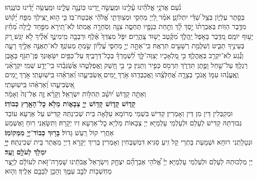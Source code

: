 \documentclass[twoside, openany, parskip=half, 11pt]{book}
\begin{document}
\begin{sometimes}


\halfkaddish


\label{vihi noam}

נֹ֨עַם אֲדֹנָ֥י אֱלֹהֵ֗ינוּ עָ֫לֵ֥ינוּ וּמַֽעֲשֵׂ֣ה יָ֭דֵינוּ כּֽוֹנֲנָ֣ה עָלֵ֑ינוּ וּמַֽעֲשֵׂ֥ה יָ֝דֵ֗ינוּ כּֽוֹנֲנֵֽהוּ׃\\
בְּסֵ֣תֶר עֶלְי֑וֹן בְּצֵ֥ל שַׁ֝דַּ֗י יִתְלוֹנָֽן׃
אֹמַ֗ר לַ֭יְיָ מַחְסִ֣י וּמְצֽוּדָתִ֑י אֱ֝לֹהַ֗י אֶבְטַח־בּֽוֹ׃
כִּ֤י ה֣וּא יַ֭צִּֽילְךָ מִפַּ֥ח יָ֝ק֗וּשׁ מִדֶּ֥בֶר הַוּֽוֹת׃
בְּאֶבְרָת֨וֹ יָ֣סֶךְ לָ֗ךְ וְתַ֣חַת כְּנָפָ֣יו תֶּחְסֶ֑ה צִנָּ֖ה וְסֹֽחֵרָ֣ה אֲמִתּֽוֹ׃
לֹֽא־תִ֭ירָא מִפַּ֣חַד לָ֑יְלָה מֵ֝חֵ֗ץ יָע֥וּף יוֹמָֽם׃
מִ֭דֶּֽבֶר בָּאֹ֣פֶל יַֽהֲלֹ֑ךְ מִ֝קֶּ֗טֶב יָשׁ֥וּד צָֽהֳרָֽיִם׃
יִפֹּ֤ל מִצִּדְּךָ֙ אֶ֗לֶף וּרְבָבָ֥ה מִֽימִינֶ֑ךָ אֵ֝לֶ֗יךָ לֹ֣א יִגָּֽשׁ׃
רַ֭ק בְּעֵינֶ֣יךָ תַבִּ֑יט וְשִׁלֻּמַ֖ת רְשָׁעִ֣ים תִּרְאֶֽה׃
כִּֽי־אַתָּ֣ה יְיָ֣ מַחְסִּ֑י עֶ֝לְי֗וֹן שַׂ֣מְתָּ מְעוֹנֶֽךָ׃
לֹֽא־תְאֻנֶּ֣ה אֵלֶ֣יךָ רָעָ֑ה וְנֶ֗֝גַע לֹֽא־יִקְרַ֥ב בְּאָֽהֳלֶֽךָ׃
כִּ֣י מַ֭לְאָכָיו יְצַוֶּה־לָּ֑ךְ לִ֝שְׁמָרְךָ֗ בְּכׇל־דְּרָכֶֽיךָ׃
עַל־כַּפַּ֥יִם יִשָּׂא֑וּנְךָ פֶּן־תִּגֹּ֖ף בָּאֶ֣בֶן רַגְלֶֽךָ׃
עַל־שַׁ֣חַל וָפֶ֣תֶן תִּדְרֹ֑ךְ תִּרְמֹ֖ס כְּפִ֣יר וְתַנִּֽין׃
כִּ֤י בִ֣י חָ֭שַׁק וַֽאֲפַלְּטֵ֑הוּ אֲשַׂ֝גְּבֵ֗הוּ כִּֽי־יָדַ֥ע שְׁמִֽי׃
יִקְרָאֵ֨נִי וְֽאֶֽעֱנֵ֗הוּ עִמּ֣וֹ אָֽנֹכִ֣י בְצָרָ֑ה אֲ֝חַלְּצֵֽ֗הוּ וַֽאֲכַבְּדֵֽהוּ׃
אֹ֣רֶךְ יָ֭מִים ֖אַשְׂבִּיעֵ֑הוּ וְ֝אַרְאֵ֗הוּ בִּֽישֽׁוּעָתִֽי׃
אֹ֣רֶךְ יָ֭מִים ֖אַשְׂבִּיעֵ֑הוּ וְ֝אַרְאֵ֗הוּ בִּֽישֽׁוּעָתִֽי׃\\
\label{v ata kadosh}
וְאַתָּ֥ה
%
קָד֑וֹשׁ י֝וֹשֵׁ֗ב תְּהִלּ֥וֹת יִשְׂרָאֵֽל׃
%
וְקָרָ֨א זֶ֤ה אֶל־זֶה֙ וְאָמַ֔ר׃\\
\textbf{קָד֧וֹשׁ קָד֛וֹשׁ קָד֖וֹשׁ יְיָ֣ צְבָא֑וֹת מְלֹ֥א כׇל־הָאָ֖רֶץ כְּבוֹדֽוֹ׃}\\
וּמְקַבְּלִין דֵּין מִן דֵּין וְאָמְרִין׃ קַדִּישׁ בִּשְׁמֵי מְרוֹמָא עִלָּאָה בֵּית שְׁכִינְתֵּהּ קַדִּישׁ עַל אַרְעָא עוֹבַד גְּבוּרְתֵּהּ קַדִּישׁ לְעָלַם וּלְעָלְמֵי עָלְמַיָּא יְיָ צְבָאוֹת מַלְיָא כׇל־אַרְעָא זִיו יְקָרֵהּ׃ וַתִּשָּׂאֵֽנִי רֽוּחַ וָאֶשְׁמַע אַחֲרַי קוֹל רַֽעַשׁ גָּדוֹל׃
\textbf{בָּר֥וּךְ כְּבוֹד־יְיָ֖ מִמְּקוֹמֽוֹ׃} \\
וּנְטָלַֽתְנִי רוּחָא וּשְׁמָעֵת בַּתְרַי קָל זִֽיעַ סַגִּיא דִּמְשַׁבְּחִין וְאָמְרִין׃ בְּרִיךְ יְקָרָא דַיְיָ מֵאֲתַר בֵּית שְׁכִינְתֵּהּ׃
\textbf{יְיָ֥ יִמְלֹ֖ךְ לְעֹלָ֥ם וָעֶֽד׃} \\
יְיָ מַלְכוּתֵהּ לְעָלַם וּלְעַלְמֵי עָלְמְיָּא׃ יְיָ֗
%
אֱ֠לֹהֵי אַבְרָהָ֞ם יִצְחָ֤ק וְיִשְׂרָאֵל֙ אֲבֹתֵ֔ינוּ שָׁמְרָה־זֹּ֣את לְעוֹלָ֔ם לְיֵ֥צֶר מַחְשְׁב֖וֹת לְבַ֣ב עַמֶּ֑ךָ וְהָכֵ֥ן לְבָבָ֖ם אֵלֶֽיךָ׃ וְה֤וּא

\end{sometimes}
\end{document}
